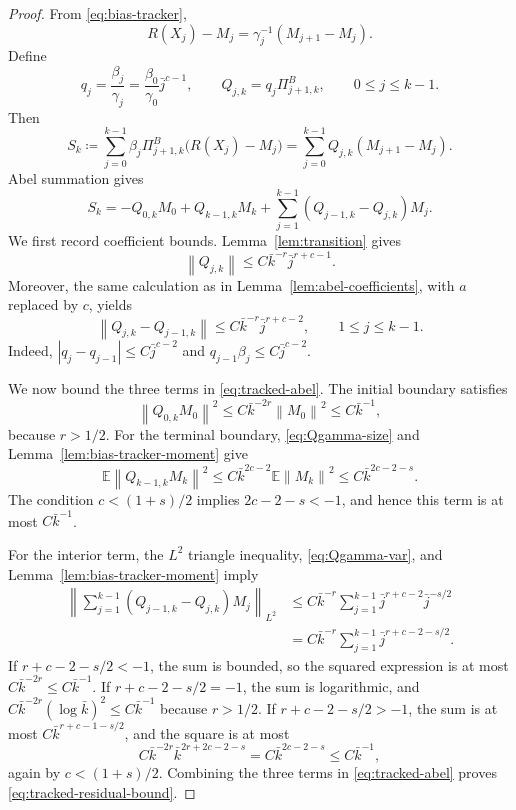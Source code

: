 \documentclass{article}
\newcommand{\E}{\mathbb{E}}
\newcommand{\norm}[1]{\left\lVert #1\right\rVert}
\begin{document}
\begin{proof}
From \eqref{eq:bias-tracker},
\[
  R(X_j)-M_j=\gamma_j^{-1}(M_{j+1}-M_j).
\]
Define
\[
  q_j=\frac{\beta_j}{\gamma_j}=\frac{\beta_0}{\gamma_0}\bar j^{c-1},
  \qquad
  Q_{j,k}=q_j\Pi^B_{j+1,k},
  \qquad 0\le j\le k-1.
\]
Then
\[
  S_k\coloneqq
  \sum_{j=0}^{k-1}\beta_j\Pi^B_{j+1,k}\big(R(X_j)-M_j\big)
  =\sum_{j=0}^{k-1}Q_{j,k}(M_{j+1}-M_j).
\]
Abel summation gives
\begin{equation}
  S_k=-Q_{0,k}M_0+Q_{k-1,k}M_k+
      \sum_{j=1}^{k-1}(Q_{j-1,k}-Q_{j,k})M_j. \label{eq:tracked-abel}
\end{equation}
We first record coefficient bounds. Lemma~\ref{lem:transition} gives
\begin{equation}
  \norm{Q_{j,k}}
  \le C\bar k^{-r}\bar j^{r+c-1}. \label{eq:Qgamma-size}
\end{equation}
Moreover, the same calculation as in Lemma~\ref{lem:abel-coefficients}, with $a$ replaced by $c$, yields
\begin{equation}
  \norm{Q_{j,k}-Q_{j-1,k}}
  \le C\bar k^{-r}\bar j^{r+c-2},
  \qquad 1\le j\le k-1. \label{eq:Qgamma-var}
\end{equation}
Indeed, $|q_j-q_{j-1}|\le C\bar j^{c-2}$ and $q_{j-1}\beta_j\le C\bar j^{c-2}$.

We now bound the three terms in \eqref{eq:tracked-abel}. The initial boundary satisfies
\[
  \norm{Q_{0,k}M_0}^2\le C\bar k^{-2r}\norm{M_0}^2\le C\bar k^{-1},
\]
because $r>1/2$. For the terminal boundary, \eqref{eq:Qgamma-size} and Lemma~\ref{lem:bias-tracker-moment} give
\[
  \E\norm{Q_{k-1,k}M_k}^2
  \le C\bar k^{2c-2}\E\norm{M_k}^2
  \le C\bar k^{2c-2-s}.
\]
The condition $c<(1+s)/2$ implies $2c-2-s<-1$, and hence this term is at most $C\bar k^{-1}$.

For the interior term, the $L^2$ triangle inequality, \eqref{eq:Qgamma-var}, and Lemma~\ref{lem:bias-tracker-moment} imply
\begin{align*}
  \left\|\sum_{j=1}^{k-1}(Q_{j-1,k}-Q_{j,k})M_j\right\|_{L^2}
  &\le C\bar k^{-r}\sum_{j=1}^{k-1}\bar j^{r+c-2}\bar j^{-s/2}  \\
  &=C\bar k^{-r}\sum_{j=1}^{k-1}\bar j^{r+c-2-s/2}.
\end{align*}
If $r+c-2-s/2<-1$, the sum is bounded, so the squared expression is at most $C\bar k^{-2r}\le C\bar k^{-1}$. If $r+c-2-s/2=-1$, the sum is logarithmic, and $C\bar k^{-2r}(\log\bar k)^2\le C\bar k^{-1}$ because $r>1/2$. If $r+c-2-s/2>-1$, the sum is at most $C\bar k^{r+c-1-s/2}$, and the square is at most
\[
  C\bar k^{-2r}\bar k^{2r+2c-2-s}
  =C\bar k^{2c-2-s}
  \le C\bar k^{-1},
\]
again by $c<(1+s)/2$. Combining the three terms in \eqref{eq:tracked-abel} proves \eqref{eq:tracked-residual-bound}.
\end{proof}
\end{document}
